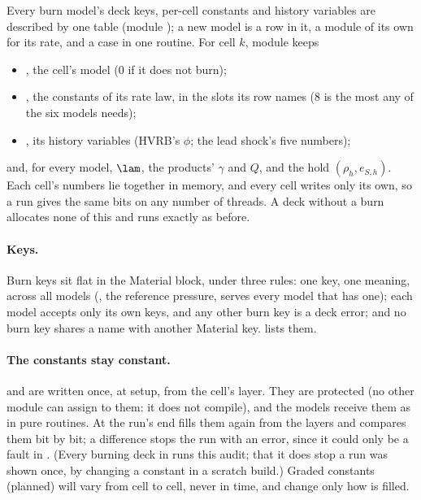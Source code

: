 Every burn model's deck keys, per-cell constants and history variables are
described by one table (module ); a new model is a row in
it, a module of its own for its rate, and a case in one routine. For cell
$k$, module  keeps
\begin{itemize}
\item {}, the cell's model (0 if it does not burn);
\item {}, the constants of its rate law, in the slots its
  row names (8 is the most any of the six models needs);
\item {}, its history variables (HVRB's $\phi$; the lead
  shock's five numbers);
\end{itemize}
and, for every model, $\lam$, the products' $\gamma$ and $Q$, and the hold
$(\rho_h, e_{S,h})$. Each cell's numbers lie together in memory, and every
cell writes only its own, so a run gives the same bits on any number of
threads. A deck without a burn allocates none of this and runs exactly as
before.

\paragraph{Keys.} Burn keys sit flat in the Material block, under three
rules: one key, one meaning, across all models (, the reference
pressure, serves every model that has one); each model accepts only its own
keys, and any other burn key is a deck error; and no burn key shares a name
with another Material key.  lists them.

\paragraph{The constants stay constant.}  and  are
written once, at setup, from the cell's layer. They are protected (no other
module can assign to them: it does not compile), and the models receive them
as  in pure routines. At the run's end 
fills them again from the layers and compares them bit by bit; a difference
stops the run with an error, since it could only be a fault in \bw. (Every
burning deck in  runs this audit; that it does stop a run was
shown once, by changing a constant in a scratch build.) Graded
constants (planned) will vary from cell to cell, never in time, and change
only how  is filled.

